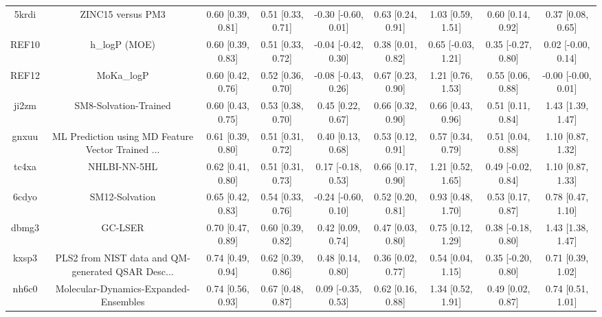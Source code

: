 \documentclass{article}
\begin{document}
\begin{center}
\begin{longtable}{|ccccccccc|}
 5krdi &                                  ZINC15 versus PM3 &  0.60 [0.39, 0.81] &  0.51 [0.33, 0.71] &   -0.30 [-0.60, 0.01] &  0.63 [0.24, 0.91] &    1.03 [0.59, 1.51] &    0.60 [0.14, 0.92] &     0.37 [0.08, 0.65] \\
 REF10 &                                      h\_logP (MOE) &  0.60 [0.39, 0.83] &  0.51 [0.33, 0.72] &   -0.04 [-0.42, 0.30] &  0.38 [0.01, 0.82] &   0.65 [-0.03, 1.21] &   0.35 [-0.27, 0.80] &    0.02 [-0.00, 0.14] \\
 REF12 &                                         MoKa\_logP &  0.60 [0.42, 0.76] &  0.52 [0.36, 0.70] &   -0.08 [-0.43, 0.26] &  0.67 [0.23, 0.90] &    1.21 [0.76, 1.53] &    0.55 [0.06, 0.88] &   -0.00 [-0.00, 0.01] \\
 ji2zm &                              SM8-Solvation-Trained &  0.60 [0.43, 0.75] &  0.53 [0.38, 0.70] &     0.45 [0.22, 0.67] &  0.66 [0.32, 0.90] &    0.66 [0.43, 0.96] &    0.51 [0.11, 0.84] &     1.43 [1.39, 1.47] \\
 gnxuu &  ML Prediction using MD Feature Vector Trained ... &  0.61 [0.39, 0.80] &  0.51 [0.31, 0.72] &     0.40 [0.13, 0.68] &  0.53 [0.12, 0.91] &    0.57 [0.34, 0.79] &    0.51 [0.04, 0.88] &     1.10 [0.87, 1.32] \\
 tc4xa &                                       NHLBI-NN-5HL &  0.62 [0.41, 0.80] &  0.51 [0.31, 0.73] &    0.17 [-0.18, 0.53] &  0.66 [0.17, 0.90] &    1.21 [0.52, 1.65] &   0.49 [-0.02, 0.84] &     1.10 [0.87, 1.33] \\
 6cdyo &                                     SM12-Solvation &  0.65 [0.42, 0.83] &  0.54 [0.33, 0.76] &   -0.24 [-0.60, 0.10] &  0.52 [0.20, 0.81] &    0.93 [0.48, 1.70] &    0.53 [0.17, 0.87] &     0.78 [0.47, 1.10] \\
 dbmg3 &                                            GC-LSER &  0.70 [0.47, 0.89] &  0.60 [0.39, 0.82] &     0.42 [0.09, 0.74] &  0.47 [0.03, 0.80] &    0.75 [0.12, 1.29] &   0.38 [-0.18, 0.80] &     1.43 [1.38, 1.47] \\
 kxsp3 &  PLS2 from NIST data and QM-generated QSAR Desc... &  0.74 [0.49, 0.94] &  0.62 [0.39, 0.86] &     0.48 [0.14, 0.80] &  0.36 [0.02, 0.77] &    0.54 [0.04, 1.15] &   0.35 [-0.20, 0.80] &     0.71 [0.39, 1.02] \\
 nh6c0 &              Molecular-Dynamics-Expanded-Ensembles &  0.74 [0.56, 0.93] &  0.67 [0.48, 0.87] &    0.09 [-0.35, 0.53] &  0.62 [0.16, 0.88] &    1.34 [0.52, 1.91] &    0.49 [0.02, 0.87] &     0.74 [0.51, 1.01] \\

\end{longtable}
\end{center}
\end{document}
